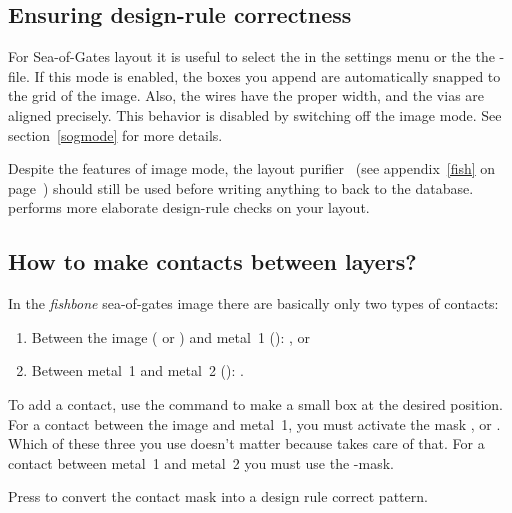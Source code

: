 
\subsection{Ensuring design-rule correctness}
For Sea-of-Gates layout it is useful to select the 
in the settings menu or the the -file. If this mode is
enabled, the boxes you append are automatically snapped to the grid of
the image. Also, the wires have the proper width, and the vias
are aligned precisely. This behavior is disabled by switching off the
image mode. See section~\ref{sogmode} for more details.

Despite the features of image mode, the layout purifier~
(see appendix~\ref{fish} on page~\pageref{fish}) should still be used before
writing anything to back to the database.  performs more
elaborate design-rule checks on your layout.

\subsection{How to make contacts between layers?}
In the {\sl fishbone} sea-of-gates image there are basically only two types of
contacts: 
\begin{enumerate}
\item
Between the image ( or ) and metal~1 ():
,  or 
\item
Between metal~1 and metal~2 (): .
\end{enumerate}
To add a contact, use the  command to make a small box
at the desired position.  For a contact between the image and metal~1,
you must activate the mask ,  or . Which
of these three you use doesn't matter because  takes care of
that.  For a contact between metal~1 and metal~2 you must use the
-mask.

Press  to convert the contact mask into a design rule
correct pattern.

